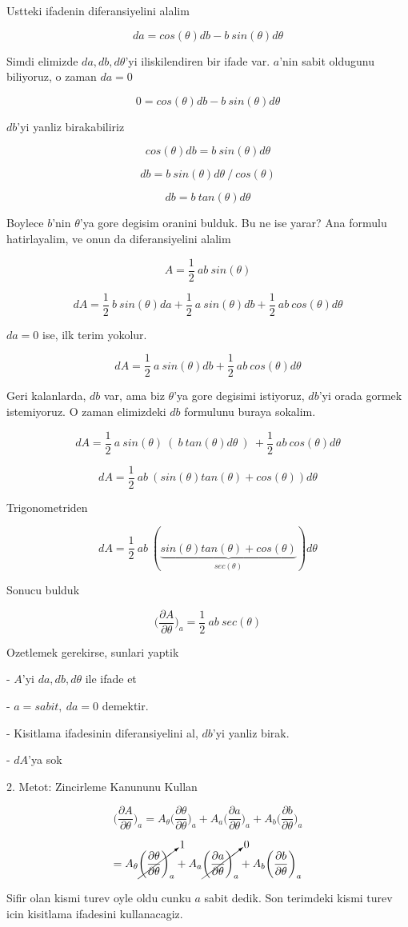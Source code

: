 \documentclass[12pt,fleqn]{article}
\begin{document}
Ustteki ifadenin diferansiyelini alalim

\[ da = cos(\theta) db - b \ sin(\theta) d\theta \]

Simdi elimizde $da,db,d\theta$'yi iliskilendiren bir ifade var. $a$'nin
sabit oldugunu biliyoruz, o zaman $da=0$

\[ 0 = cos(\theta) db - b \ sin(\theta) d\theta \]

$db$'yi yanliz birakabiliriz

\[ cos(\theta) db = b \ sin(\theta) d\theta \]

\[ db = b \ sin(\theta) d\theta \ / \ cos(\theta) \]

\[ db = b \ tan(\theta) d\theta  \]

Boylece $b$'nin $\theta$'ya gore degisim oranini bulduk. Bu ne ise yarar?
Ana formulu hatirlayalim, ve onun da diferansiyelini alalim

\[ A = \frac{1}{2} \ ab \ sin(\theta) \]

\[ dA = \frac{1}{2} \ b \ sin(\theta) da + 
\frac{1}{2} \ a \ sin(\theta) db + 
\frac{1}{2} \ ab \ cos(\theta)d\theta
 \]

$da = 0$ ise, ilk terim yokolur. 

\[ dA = 
\frac{1}{2} \ a \ sin(\theta) db + 
\frac{1}{2} \ ab \ cos(\theta)d\theta
 \]

Geri kalanlarda, $db$ var, ama biz $\theta$'ya gore degisimi istiyoruz,
$db$'yi orada gormek istemiyoruz. O zaman elimizdeki $db$ formulunu buraya
sokalim. 

\[ dA =  
\frac{1}{2} \ a \ sin(\theta) \ ( \ b \ tan(\theta) d\theta \ ) \ + 
\frac{1}{2} \ ab \ cos(\theta)d\theta
\]

\[ dA =  
\frac{1}{2} \ ab \ (sin(\theta) tan(\theta) +  cos (\theta) )d\theta
\]

Trigonometriden 

\[ dA =  
\frac{1}{2} \ ab \ (
\underbrace{sin(\theta) tan(\theta) +  cos (\theta)}_{sec(\theta)}
)d\theta
\]

Sonucu bulduk 

\[ \bigg( \frac{\partial A}{\partial \theta} \bigg)_{a} = 
\frac{1}{2} \ ab \ sec(\theta)
 \]

Ozetlemek gerekirse, sunlari yaptik

- $A$'yi $da,db,d\theta$ ile ifade et

- $a=sabit, \ da=0$ demektir.

- Kisitlama ifadesinin diferansiyelini al, $db$'yi yanliz birak. 

- $dA$'ya sok

2. Metot: Zincirleme Kanununu Kullan

\[ \bigg( \frac{\partial A}{\partial \theta} \bigg)_{a} = 
A_\theta \bigg( \frac{\partial \theta}{\partial \theta} \bigg)_{a} + 
A_a \bigg( \frac{\partial a}{\partial \theta} \bigg)_{a} + 
A_b \bigg( \frac{\partial b}{\partial \theta} \bigg)_{a} 
 \]

\[  = 
A_\theta \cancelto{1}{\bigg( \frac{\partial \theta}{\partial \theta} \bigg)_{a}} + 
A_a \cancelto{0}{\bigg( \frac{\partial a}{\partial \theta} \bigg)_{a}} + 
A_b \bigg( \frac{\partial b}{\partial \theta} \bigg)_{a}
 \]

Sifir olan kismi turev oyle oldu cunku $a$ sabit dedik. Son terimdeki
kismi turev icin kisitlama ifadesini kullanacagiz.
\end{document}
